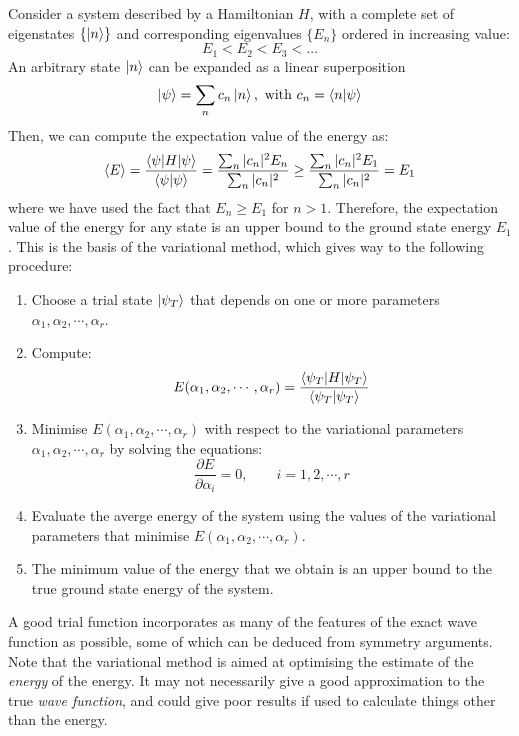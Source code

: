 Consider a system described by a Hamiltonian $H$, with a complete set of eigenstates $\{\ket{n}\}$ and corresponding eigenvalues $\{E_n\}$ ordered in increasing value:
\begin{equation}
    E_1 < E_2 < E_3 < \dots
\end{equation}
An arbitrary state $\ket{n}$ can be expanded as a linear superposition
\begin{equation}
    \ket{\psi} = \sum_n c_n\ket{n},\text{ with }c_n = \braket{n|\psi}
\end{equation}
Then, we can compute the expectation value of the energy as:
\begin{equation}
    \braket{E} = \frac{\braket{\psi|H|\psi}}{\braket{\psi|\psi}} = \frac{\sum_n |c_n|^2 E_n }{\sum_n |c_n|^2} \geq \frac{\sum_n |c_n|^2 E_1 }{\sum_n |c_n|^2} = E_1
\end{equation}
where we have used the fact that $E_n \geq E_1$ for $n>1$. Therefore, the expectation value of the energy for any state is an upper bound to the ground state energy $E_1$. This is the basis of the variational method, which gives way to the following procedure:
\begin{enumerate}
    \item Choose a trial state $\ket{\psi_T}$ that depends on one or more parameters $\alpha_1, \alpha_2, \cdots, \alpha_r$.
    \item Compute:
    \begin{equation}
        E (\alpha_1, \alpha_2, \cdots, \alpha_r) = \frac{\braket{\psi_T|H|\psi_T}}{\braket{\psi_T|\psi_T}}
    \end{equation}
    \item Minimise $E (\alpha_1, \alpha_2, \cdots, \alpha_r)$ with respect to the variational parameters $\alpha_1, \alpha_2, \cdots, \alpha_r$ by solving the equations:
    \begin{equation}
        \frac{\partial E}{\partial \alpha_i} = 0, \qquad i = 1, 2, \cdots, r
    \end{equation}
    \item Evaluate the averge energy of the system using the values of the variational parameters that minimise $E (\alpha_1, \alpha_2, \cdots, \alpha_r)$.
    \item The minimum value of the energy that we obtain is an upper bound to the true ground state energy of the system.
\end{enumerate}

A good trial function incorporates as many of the features of the exact wave function as possible, some of which can be deduced from symmetry arguments. Note that the variational method is aimed at optimising the estimate of the \textit{energy} of the energy. It may not necessarily give a good approximation to the true \textit{wave function}, and could give poor results if used to calculate things other than the energy.


